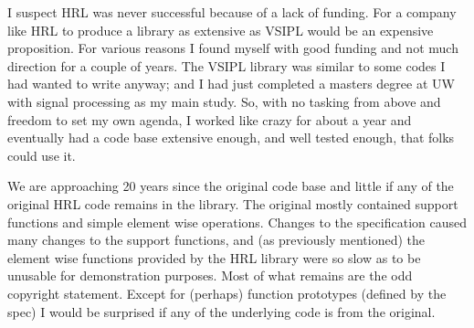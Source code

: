 I suspect HRL was never successful because of a lack of funding. For a company like HRL to produce a library as extensive as VSIPL would be an expensive proposition. For various reasons I found myself with good funding and not much direction for a couple of years. The VSIPL library was similar to some codes I had wanted to write anyway; and I had just completed a masters degree at UW with signal processing as my main study. So, with no tasking from above and freedom to set my own agenda, I worked like crazy for about a year and eventually had a code base extensive enough, and well tested enough, that folks could use it.

We are approaching 20 years since the original code base and little if any of the original HRL code remains in the library.  The original mostly contained support functions and simple element wise operations. Changes to the specification caused many changes to the support functions, and (as previously mentioned) the element wise functions provided by the HRL library were so slow as to be unusable for demonstration purposes. Most of what remains are the odd copyright statement. Except for (perhaps) function prototypes (defined by the spec) I would be surprised if any of the underlying code is from the original.

